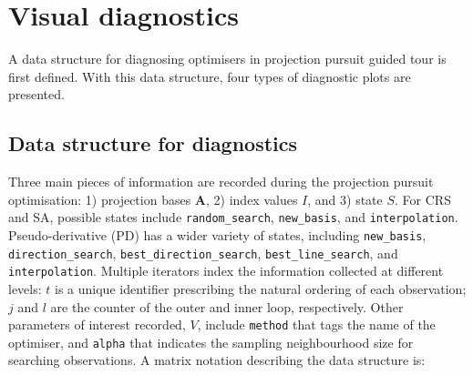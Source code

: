 \hypertarget{vis-diag}{%
\section{Visual diagnostics}\label{vis-diag}}

A data structure for diagnosing optimisers in projection pursuit guided tour is first defined. With this data structure, four types of diagnostic plots are presented.

\hypertarget{data-structure-for-diagnostics}{%
\subsection{Data structure for diagnostics}\label{data-structure-for-diagnostics}}

Three main pieces of information are recorded during the projection pursuit optimisation: 1) projection bases \(\mathbf{A}\), 2) index values \(I\), and 3) state \(S\). For CRS and SA, possible states include \texttt{random\_search}, \texttt{new\_basis}, and \texttt{interpolation}. Pseudo-derivative (PD) has a wider variety of states, including \texttt{new\_basis}, \texttt{direction\_search}, \texttt{best\_direction\_search}, \texttt{best\_line\_search}, and \texttt{interpolation}. Multiple iterators index the information collected at different levels: \(t\) is a unique identifier prescribing the natural ordering of each observation; \(j\) and \(l\) are the counter of the outer and inner loop, respectively. Other parameters of interest recorded, \(V\), include \texttt{method} that tags the name of the optimiser, and \texttt{alpha} that indicates the sampling neighbourhood size for searching observations. A matrix notation describing the data structure is:

\newpage

